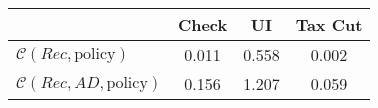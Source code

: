 \begin{tabular}{@{}lccc@{}} 
\toprule 
                          & Check      & UI    & Tax Cut    \\  \midrule 
$\mathcal{C}(Rec,\text{policy})$ & 0.011  & 0.558  & 0.002     \\ 
$\mathcal{C}(Rec, AD,\text{policy})$ & 0.156  & 1.207  & 0.059     \\ 
\end{tabular}  
